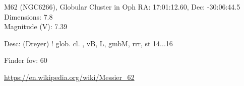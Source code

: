 \begin{block}{M62 (NGC6266), Globular Cluster in Oph}
    RA: 17:01:12.60, Dec: -30:06:44.5 \\ 
    Dimensions: 7.8 \\ 
    Magnitude (V): 7.39


    Desc: (Dreyer) ! glob. cl. , vB, L, gmbM, rrr, st 14...16 

    Finder fov: 60 

    \url{https://en.wikipedia.org/wiki/Messier_62} 
\end{block}